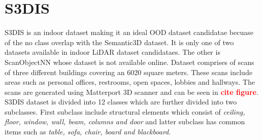 \section{S3DIS}
S3DIS is an indoor dataset making it an ideal OOD dataset candidatae becuase of the no class overlap with the Semantic3D dataset.
It is only one of two datasets available in indoor LiDAR dataset candidataes. 
The other is ScanObjectNN whose dataset is not available online.
Dataset comprises of scans of three different buildings covering an 6020 square meters.
These scans include areas such as personal offices, restrooms, open spaces, lobbies and hallways.
The scans are generated using Matterport 3D scanner and can be seen in \textcolor{red}{\textbf{cite figure}}.
S3DIS dataset is divided into 12 classes which are further divided into two subclasses.
First subclass include structural elements which consist of \textit{ceiling, floor, window, wall, beam, columns and door}
and latter subclass has common items such as \textit{table, sofa, chair, board and blackboard}.
